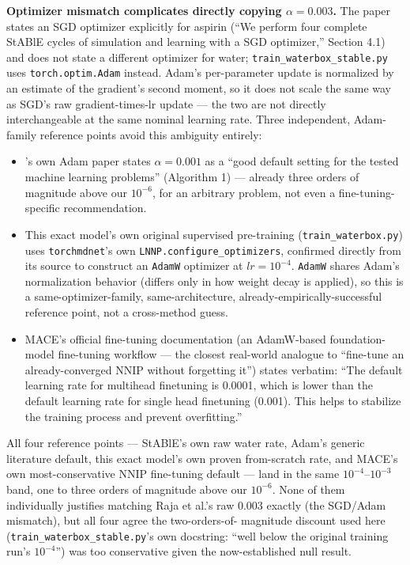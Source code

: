 \documentclass[11pt]{article}
\begin{document}
\textbf{Optimizer mismatch complicates directly copying $\alpha=0.003$.} The
paper states an SGD optimizer explicitly for aspirin (``We perform four
complete StABlE cycles of simulation and learning with a SGD optimizer,''
Section 4.1) and does not state a different optimizer for water;
\texttt{train\_waterbox\_stable.py} uses \texttt{torch.optim.Adam} instead.
Adam's per-parameter update is normalized by an estimate of the gradient's
second moment, so it does not scale the same way as SGD's raw
gradient-times-lr update --- the two are not directly interchangeable at the
same nominal learning rate. Three independent, Adam-family reference points
avoid this ambiguity entirely:
\begin{itemize}
  \item \citet{kingmaba2015adam}'s own Adam paper states $\alpha=0.001$ as a
  ``good default setting for the tested machine learning problems''
  (Algorithm 1) --- already three orders of magnitude above our $10^{-6}$,
  for an arbitrary problem, not even a fine-tuning-specific recommendation.
  \item This exact model's own original supervised pre-training
  (\texttt{train\_waterbox.py}) uses \texttt{torchmdnet}'s own
  \texttt{LNNP.configure\_optimizers}, confirmed directly from its source
  \citep{torchmdnet-code} to construct an \texttt{AdamW} optimizer at
  $lr=10^{-4}$. \texttt{AdamW} shares Adam's normalization behavior (differs
  only in how weight decay is applied), so this is a same-optimizer-family,
  same-architecture, already-empirically-successful reference point, not a
  cross-method guess.
  \item MACE's official fine-tuning documentation \citep{mace-finetuning-docs}
  (an AdamW-based foundation-model fine-tuning workflow --- the closest
  real-world analogue to ``fine-tune an already-converged NNIP without
  forgetting it'') states verbatim: ``The default learning rate for
  multihead finetuning is 0.0001, which is lower than the default learning
  rate for single head finetuning (0.001). This helps to stabilize the
  training process and prevent overfitting.''
\end{itemize}

All four reference points --- StABlE's own raw water rate, Adam's generic
literature default, this exact model's own proven from-scratch rate, and
MACE's own most-conservative NNIP fine-tuning default --- land in the same
$10^{-4}$--$10^{-3}$ band, one to three orders of magnitude above our
$10^{-6}$. None of them individually justifies matching Raja et al.'s raw
0.003 exactly (the SGD/Adam mismatch), but all four agree the two-orders-of-
magnitude discount used here (\texttt{train\_waterbox\_stable.py}'s own
docstring: ``well below the original training run's $10^{-4}$'') was too
conservative given the now-established null result.
\end{document}

